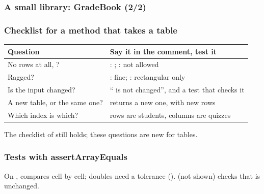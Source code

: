 \documentclass[aspectratio=169,10pt,compress]{beamer}
\begin{document}
\begin{frame}[t,fragile] \frametitle{A small library: GradeBook (2/2)}
\end{frame}




\begin{frame}[t,fragile] \frametitle{Checklist for a method that takes a table}


\begin{table}
		\small
		\begin{tabular}{@{}L{0.40\textwidth}L{0.52\textwidth}@{}}
			\toprule
			\textbf{Question} & \textbf{Say it in the comment, test it} \\
			\midrule
			No rows at all, ?      & : ; : not allowed \\
			Ragged?                                   & : fine; : rectangular only \\
			Is the input changed?                     & `` is not changed'', and a test that checks it \\
			A new table, or the same one?             &  returns a new one, with new rows \\
			Which index is which?                     & rows are students, columns are quizzes \\
			\bottomrule
		\end{tabular}
\end{table}%


	\vspace{0.3em}
	\small The checklist of  still holds; these questions are new for tables.
\end{frame}








\begin{frame}[t,fragile] \frametitle{Tests with assertArrayEquals}

	\footnotesize On ,  compares cell by cell; doubles need a tolerance ().
	 (not shown) checks that  is unchanged.
\end{frame}
\end{document}
